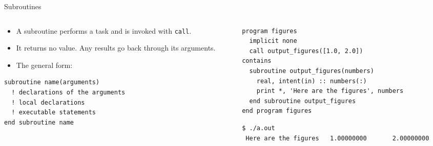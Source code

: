 \begin{frame}[fragile]{Subroutines}
  \begin{columns}[T]
    \begin{column}{0.45\textwidth}
      \begin{itemize}
        \item A subroutine performs a task and is invoked with \texttt{call}.
        \item It returns no value. Any results go back through its arguments.
        \item The general form:
      \end{itemize}
      \begin{lstlisting}
subroutine name(arguments)
  ! declarations of the arguments
  ! local declarations
  ! executable statements
end subroutine name
      \end{lstlisting}
    \end{column}

    \begin{column}{0.55\textwidth}
      \begin{lstlisting}
program figures
  implicit none
  call output_figures([1.0, 2.0])
contains
  subroutine output_figures(numbers)
    real, intent(in) :: numbers(:)
    print *, 'Here are the figures', numbers
  end subroutine output_figures
end program figures
      \end{lstlisting}
      \begin{lstlisting}[language=bash]
$ ./a.out
 Here are the figures   1.00000000       2.00000000
      \end{lstlisting}
    \end{column}
  \end{columns}
\end{frame}


